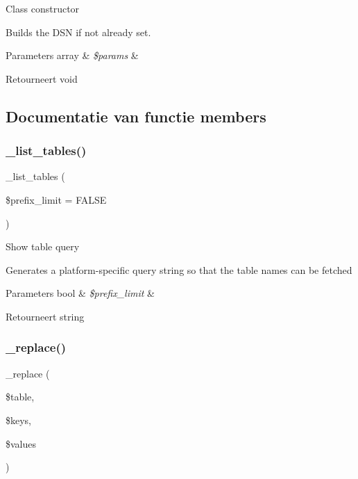 Class constructor

Builds the D\+SN if not already set.


\begin{DoxyParams}[1]{Parameters}
array & {\em \$params} & \\
\hline
\end{DoxyParams}
\begin{DoxyReturn}{Retourneert}
void 
\end{DoxyReturn}


\subsection{Documentatie van functie members}
\mbox{\label{class_c_i___d_b__pdo__sqlite__driver_a435c0f3ce54fe7daa178baa8532ebd54}} 
\subsubsection{\texorpdfstring{\_list\_tables()}{\_list\_tables()}}
{\footnotesize\ttfamily \+\_\+list\+\_\+tables (\begin{DoxyParamCaption}\item[{}]{\$prefix\+\_\+limit = {\ttfamily FALSE} }\end{DoxyParamCaption})\hspace{0.3cm}{\ttfamily [protected]}}

Show table query

Generates a platform-\/specific query string so that the table names can be fetched


\begin{DoxyParams}[1]{Parameters}
bool & {\em \$prefix\+\_\+limit} & \\
\hline
\end{DoxyParams}
\begin{DoxyReturn}{Retourneert}
string 
\end{DoxyReturn}
\mbox{\label{class_c_i___d_b__pdo__sqlite__driver_ae0adf73984daf2d42ad29b66c484c82b}} 
\subsubsection{\texorpdfstring{\_replace()}{\_replace()}}
{\footnotesize\ttfamily \+\_\+replace (\begin{DoxyParamCaption}\item[{}]{\$table,  }\item[{}]{\$keys,  }\item[{}]{\$values }\end{DoxyParamCaption})\hspace{0.3cm}{\ttfamily [protected]}}

